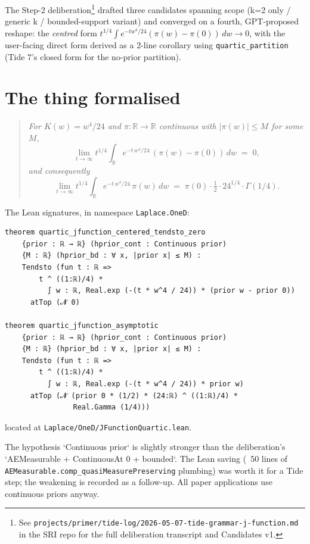 \documentclass[11pt]{article}
\begin{document}
The Step-2 deliberation\footnote{See \texttt{projects/primer/tide-log/2026-05-07-tide-grammar-j-function.md}
in the SRI repo for the full deliberation transcript and Candidates v1.}
drafted three candidates spanning scope (k=2 only / generic k /
bounded-support variant) and converged on a fourth, GPT-proposed
reshape: the \emph{centred} form
$t^{1/4}\int e^{-tw^4/24}(\pi(w)-\pi(0))\,dw \to 0$, with the
user-facing direct form derived as a 2-line corollary using
\texttt{quartic\_partition} (Tide 7's closed form for the no-prior
partition).

\section{The thing formalised}

\begin{quote}\itshape
For $K(w) = w^4/24$ and $\pi : \mathbb R \to \mathbb R$ continuous with
$|\pi(w)| \le M$ for some $M$,
\[
  \lim_{t \to \infty} t^{1/4} \int_{\mathbb R} e^{-t\,w^4/24}\,(\pi(w) - \pi(0))\,dw \;=\; 0,
\]
and consequently
\[
  \lim_{t \to \infty} t^{1/4} \int_{\mathbb R} e^{-t\,w^4/24}\,\pi(w)\,dw
  \;=\; \pi(0) \cdot \tfrac12 \cdot 24^{1/4} \cdot \Gamma(1/4).
\]
\end{quote}

\noindent The Lean signatures, in namespace \texttt{Laplace.OneD}:
\begin{verbatim}
theorem quartic_jfunction_centered_tendsto_zero
    {prior : ℝ → ℝ} (hprior_cont : Continuous prior)
    {M : ℝ} (hprior_bd : ∀ x, |prior x| ≤ M) :
    Tendsto (fun t : ℝ =>
        t ^ ((1:ℝ)/4) *
          ∫ w : ℝ, Real.exp (-(t * w^4 / 24)) * (prior w - prior 0))
      atTop (𝓝 0)

theorem quartic_jfunction_asymptotic
    {prior : ℝ → ℝ} (hprior_cont : Continuous prior)
    {M : ℝ} (hprior_bd : ∀ x, |prior x| ≤ M) :
    Tendsto (fun t : ℝ =>
        t ^ ((1:ℝ)/4) *
          ∫ w : ℝ, Real.exp (-(t * w^4 / 24)) * prior w)
      atTop (𝓝 (prior 0 * (1/2) * (24:ℝ) ^ ((1:ℝ)/4) *
                Real.Gamma (1/4)))
\end{verbatim}

\noindent located at \texttt{Laplace/OneD/JFunctionQuartic.lean}.

The hypothesis `Continuous prior` is slightly stronger than the
deliberation's `AEMeasurable + ContinuousAt 0 + bounded`. The Lean
saving (~50 lines of \texttt{AEMeasurable.comp\_quasiMeasurePreserving}
plumbing) was worth it for a Tide step; the weakening is recorded as
a follow-up. All paper applications use continuous priors anyway.
\end{document}
